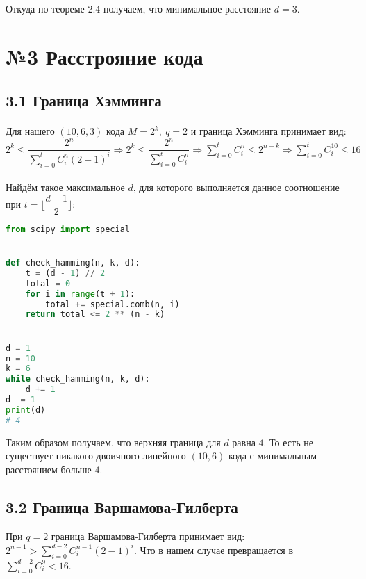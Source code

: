 \documentclass[fontsize=14pt]{article}
\begin{document}
Откуда по теореме $2.4$ получаем, что минимальное расстояние $d = 3$.

\section*{№3 Расстрояние кода}

\subsection*{3.1 Граница Хэмминга}

\paragraph*{}
Для нашего $(10, 6, 3)$ кода $M = 2^k,\ q = 2$ и граница Хэмминга принимает вид: $2^k \leq \dfrac{2^n}{\sum\limits_{i = 0}^t C_i^n \left(2 - 1
\right) ^ i} 
\Rightarrow 
2^k \leq \dfrac{2^n}{\sum\limits_{i = 0}^t C_i^n}
\Rightarrow
\sum\limits_{i = 0}^t C_i^n \leq 2^{n - k}
\Rightarrow
\sum\limits_{i = 0}^t C_i^{10} \leq 16
$

\paragraph*{}
Найдём такое максимальное $d$, для которого выполняется данное соотношение при $t = \lfloor \dfrac{d - 1}{2} \rfloor$:

\begin{lstlisting}[frame=single, language=Python]
from scipy import special


def check_hamming(n, k, d):
    t = (d - 1) // 2
    total = 0
    for i in range(t + 1):
        total += special.comb(n, i)
    return total <= 2 ** (n - k)


d = 1
n = 10
k = 6
while check_hamming(n, k, d):
    d += 1
d -= 1
print(d)
# 4	
\end{lstlisting}

Таким образом получаем, что верхняя граница для $d$ равна $4$. То есть не существует никакого двоичного линейного $(10, 6)$-кода с минимальным расстоянием больше $4$.

\subsection*{3.2 Граница Варшамова-Гилберта}

При $q = 2$ граница Варшамова-Гилберта принимает вид: $2^{n - 1} > \sum\limits_{i = 0}^{d - 2} C_i^{n - 1}(2 - 1)^i$. Что в нашем случае превращается в $\sum\limits_{i = 0}^{d - 2} C_i^9 < 16$.
 
\end{document}
